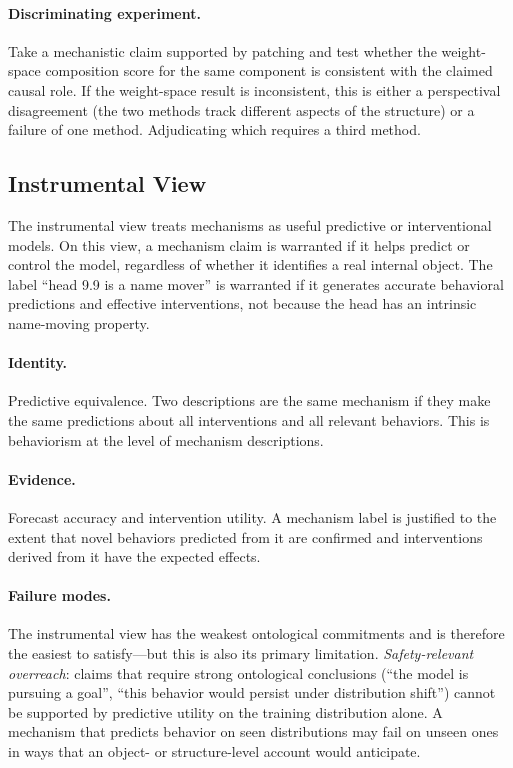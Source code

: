\documentclass[11pt]{article}
\theoremstyle{remark}
\begin{document}
\paragraph{Discriminating experiment.}
Take a mechanistic claim supported by patching and test whether the
weight-space composition score for the same component is consistent
with the claimed causal role.  If the weight-space result is inconsistent,
this is either a perspectival disagreement (the two methods track
different aspects of the structure) or a failure of one method.
Adjudicating which requires a third method.

\subsection{Instrumental View}

The instrumental view treats mechanisms as useful predictive or
interventional models.  On this view, a mechanism claim is warranted if
it helps predict or control the model, regardless of whether it
identifies a real internal object.  The label ``head 9.9 is a name
mover'' is warranted if it generates accurate behavioral predictions
and effective interventions, not because the head has an intrinsic
name-moving property.

\paragraph{Identity.}
Predictive equivalence.  Two descriptions are the same mechanism if
they make the same predictions about all interventions and all relevant
behaviors.  This is behaviorism at the level of mechanism descriptions.

\paragraph{Evidence.}
Forecast accuracy and intervention utility.  A mechanism label is
justified to the extent that novel behaviors predicted from it are
confirmed and interventions derived from it have the expected effects.

\paragraph{Failure modes.}
The instrumental view has the weakest ontological commitments and is
therefore the easiest to satisfy---but this is also its primary
limitation.  \emph{Safety-relevant overreach}: claims that require
strong ontological conclusions (``the model is pursuing a goal'',
``this behavior would persist under distribution shift'') cannot be
supported by predictive utility on the training distribution alone.
A mechanism that predicts behavior on seen distributions may fail
on unseen ones in ways that an object- or structure-level account
would anticipate.
\end{document}
